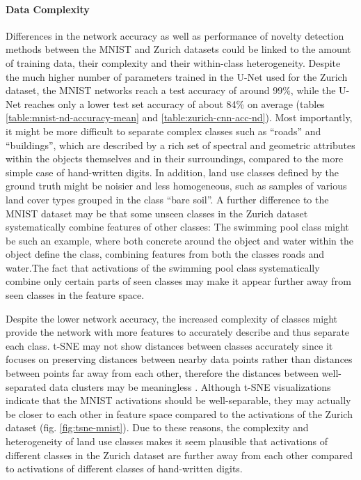 \documentclass[10pt]{article}
\begin{document}
\paragraph{Data Complexity} Differences in the network accuracy as well as performance of novelty detection methods between the \gls{MNIST} and Zurich datasets could be linked to the amount of training data, their complexity and their within-class heterogeneity. Despite the much higher number of parameters trained in the U-Net used for the Zurich dataset,  the \gls{MNIST} networks reach a test accuracy of around 99\%, while the U-Net reaches only a lower test set accuracy of about 84\% on average (tables \ref{table:mnist-nd-accuracy-mean} and \ref{table:zurich-cnn-acc-nd}). Most importantly, it might be more difficult to separate complex classes such as ``roads'' and ``buildings'', which are described by a rich set of spectral and geometric attributes within the objects themselves and in their surroundings, compared to the more simple case of hand-written digits. In addition, land use classes defined by the ground truth might be noisier and less homogeneous, such as samples of various land cover types grouped in the class ``bare soil''.  A further difference to the \gls{MNIST} dataset may be that some unseen classes in the Zurich dataset systematically combine features of other classes: The swimming pool class might be such an example, where both concrete around the object and water within the object define the class, combining features from both the classes roads and water.The fact that activations of the swimming pool class systematically combine only certain parts of seen classes may make it appear further away from seen classes in the feature space. 

Despite the lower network accuracy, the increased complexity of classes might provide the network with more features to accurately describe and thus separate each class. \gls{t-SNE} may not show distances between classes accurately since it focuses on preserving distances between nearby data points rather than distances between points far away from each other, therefore the distances between well-separated data clusters may be meaningless \cite{Maaten2008VisualizingDU, wattenberg2016how}. Although \gls{t-SNE} visualizations indicate that the \gls{MNIST} activations should be well-separable, they may actually be closer to each other in feature space compared to the activations of the Zurich dataset (fig. \ref{fig:tsne-mnist}).  Due to these reasons, the complexity and heterogeneity of land use classes makes it seem plausible that activations of different classes in the Zurich dataset are further away from each other compared to activations of different classes of hand-written digits.
\end{document}
